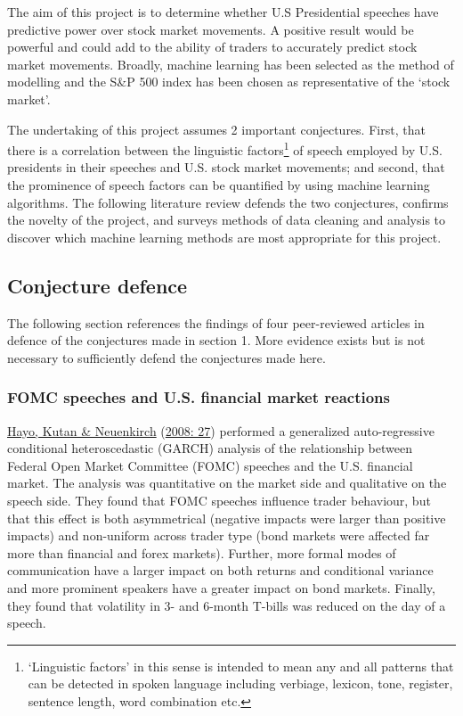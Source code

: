 \documentclass[11pt,preprint, authoryear]{elsarticle}
\numberwithin{equation}{section}
\numberwithin{figure}{section}
\numberwithin{table}{section}
\let\rmarkdownfootnote\footnote%
\def\footnote{\protect\rmarkdownfootnote}
\begin{document}
The aim of this project is to determine whether U.S Presidential
speeches have predictive power over stock market movements. A positive
result would be powerful and could add to the ability of traders to
accurately predict stock market movements. Broadly, machine learning has
been selected as the method of modelling and the S\&P 500 index has been
chosen as representative of the `stock market'.

The undertaking of this project assumes 2 important conjectures. First,
that there is a correlation between the linguistic factors\footnote{`Linguistic
  factors' in this sense is intended to mean any and all patterns that
  can be detected in spoken language including verbiage, lexicon, tone,
  register, sentence length, word combination etc.} of speech employed
by U.S. presidents in their speeches and U.S. stock market movements;
and second, that the prominence of speech factors can be quantified by
using machine learning algorithms. The following literature review
defends the two conjectures, confirms the novelty of the project, and
surveys methods of data cleaning and analysis to discover which machine
learning methods are most appropriate for this project.

\hypertarget{conjecture-defence}{%
\subsection{\texorpdfstring{Conjecture defence
\label{Conjecture defence}}{Conjecture defence }}\label{conjecture-defence}}

The following section references the findings of four peer-reviewed
articles in defence of the conjectures made in section 1. More evidence
exists but is not necessary to sufficiently defend the conjectures made
here.

\hypertarget{fomc-speeches-and-u.s.-financial-market-reactions}{%
\subsubsection{\texorpdfstring{FOMC speeches and U.S. financial market
reactions
\label{FOMC speeches}}{FOMC speeches and U.S. financial market reactions }}\label{fomc-speeches-and-u.s.-financial-market-reactions}}

\protect\hyperlink{ref-hayo2008communicating}{Hayo, Kutan \& Neuenkirch}
(\protect\hyperlink{ref-hayo2008communicating}{2008: 27}) performed a
generalized auto-regressive conditional heteroscedastic (GARCH) analysis
of the relationship between Federal Open Market Committee (FOMC)
speeches and the U.S. financial market. The analysis was quantitative on
the market side and qualitative on the speech side. They found that FOMC
speeches influence trader behaviour, but that this effect is both
asymmetrical (negative impacts were larger than positive impacts) and
non-uniform across trader type (bond markets were affected far more than
financial and forex markets). Further, more formal modes of
communication have a larger impact on both returns and conditional
variance and more prominent speakers have a greater impact on bond
markets. Finally, they found that volatility in 3- and 6-month T-bills
was reduced on the day of a speech.
\end{document}
